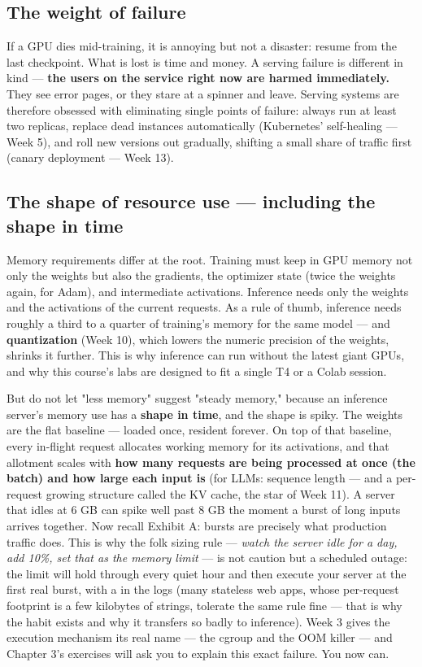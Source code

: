 \subsection*{The weight of failure}

If a GPU dies mid-training, it is annoying but not a disaster: resume from the last checkpoint. What is lost is time and money. A serving failure is different in kind — \textbf{the users on the service right now are harmed immediately.} They see error pages, or they stare at a spinner and leave. Serving systems are therefore obsessed with eliminating single points of failure: always run at least two replicas, replace dead instances automatically (Kubernetes' self-healing — Week 5), and roll new versions out gradually, shifting a small share of traffic first (canary deployment — Week 13).

\subsection*{The shape of resource use — including the shape in time}

Memory requirements differ at the root. Training must keep in GPU memory not only the weights but also the gradients, the optimizer state (twice the weights again, for Adam), and intermediate activations. Inference needs only the weights and the activations of the current requests. As a rule of thumb, inference needs roughly a third to a quarter of training's memory for the same model — and \textbf{quantization} (Week 10), which lowers the numeric precision of the weights, shrinks it further. This is why inference can run without the latest giant GPUs, and why this course's labs are designed to fit a single T4 or a Colab session.

But do not let "less memory" suggest "steady memory," because an inference server's memory use has a \textbf{shape in time}, and the shape is spiky. The weights are the flat baseline — loaded once, resident forever. On top of that baseline, every in-flight request allocates working memory for its activations, and that allotment scales with \textbf{how many requests are being processed at once (the batch) and how large each input is} (for LLMs: sequence length — and a per-request growing structure called the KV cache, the star of Week 11). A server that idles at 6 GB can spike well past 8 GB the moment a burst of long inputs arrives together. Now recall Exhibit A: bursts are precisely what production traffic does. This is why the folk sizing rule — \textit{watch the server idle for a day, add 10\%, set that as the memory limit} — is not caution but a scheduled outage: the limit will hold through every quiet hour and then execute your server at the first real burst, with a  in the logs (many stateless web apps, whose per-request footprint is a few kilobytes of strings, tolerate the same rule fine — that is why the habit exists and why it transfers so badly to inference). Week 3 gives the execution mechanism its real name — the cgroup and the OOM killer — and Chapter 3's exercises will ask you to explain this exact failure. You now can.

